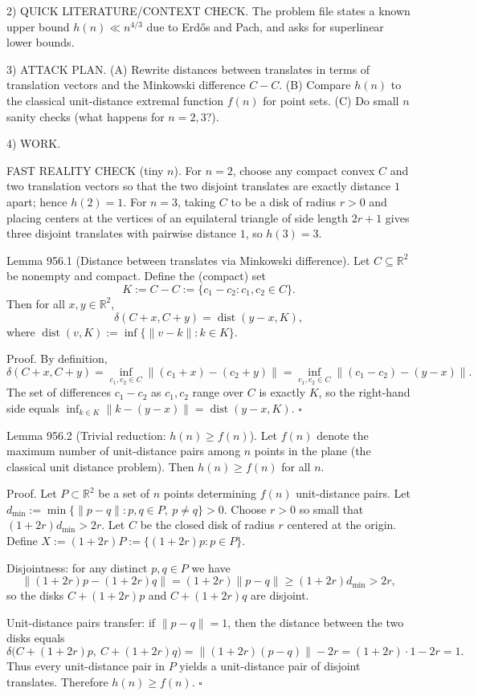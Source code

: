 2) QUICK LITERATURE/CONTEXT CHECK.
The problem file states a known upper bound $h(n)\ll n^{4/3}$ due to Erd\H{o}s and Pach, and asks for superlinear lower bounds.

3) ATTACK PLAN.
(A) Rewrite distances between translates in terms of translation vectors and the Minkowski difference $C-C$.
(B) Compare $h(n)$ to the classical unit-distance extremal function $f(n)$ for point sets.
(C) Do small $n$ sanity checks (what happens for $n=2,3$?).

4) WORK.

FAST REALITY CHECK (tiny $n$).
For $n=2$, choose any compact convex $C$ and two translation vectors so that the two disjoint translates are exactly distance $1$ apart; hence $h(2)=1$.
For $n=3$, taking $C$ to be a disk of radius $r>0$ and placing centers at the vertices of an equilateral triangle of side length $2r+1$ gives three disjoint translates with pairwise distance $1$, so $h(3)=3$.

Lemma 956.1 (Distance between translates via Minkowski difference).
Let $C\subseteq\mathbb{R}^2$ be nonempty and compact. Define the (compact) set
\[
K:=C-C:=\{c_1-c_2: c_1,c_2\in C\}.
\]
Then for all $x,y\in\mathbb{R}^2$,
\[
\delta(C+x, C+y) = \operatorname{dist}(y-x, K),
\]
where $\operatorname{dist}(v,K):=\inf\{\|v-k\|:k\in K\}$.

Proof.
By definition,
\[
\delta(C+x,C+y)=\inf_{c_1,c_2\in C}\| (c_1+x)-(c_2+y)\|
 =\inf_{c_1,c_2\in C}\|(c_1-c_2)-(y-x)\|.
\]
The set of differences $c_1-c_2$ as $c_1,c_2$ range over $C$ is exactly $K$, so the right-hand side equals
$\inf_{k\in K}\|k-(y-x)\|=\operatorname{dist}(y-x,K)$.
\hfill $\square$

Lemma 956.2 (Trivial reduction: $h(n)\ge f(n)$).
Let $f(n)$ denote the maximum number of unit-distance pairs among $n$ points in the plane (the classical unit distance problem).
Then $h(n)\ge f(n)$ for all $n$.

Proof.
Let $P\subset\mathbb{R}^2$ be a set of $n$ points determining $f(n)$ unit-distance pairs.
Let $d_{\min}:=\min\{\|p-q\|:p,q\in P,\ p\ne q\}>0$.
Choose $r>0$ so small that $(1+2r)d_{\min}>2r$.
Let $C$ be the closed disk of radius $r$ centered at the origin.
Define $X:=(1+2r)P:=\{(1+2r)p:p\in P\}$.

Disjointness: for any distinct $p,q\in P$ we have
\[\|(1+2r)p-(1+2r)q\|=(1+2r)\|p-q\|\ge (1+2r)d_{\min}>2r,\]
so the disks $C+(1+2r)p$ and $C+(1+2r)q$ are disjoint.

Unit-distance pairs transfer: if $\|p-q\|=1$, then the distance between the two disks equals
\[\delta\bigl(C+(1+2r)p,\ C+(1+2r)q\bigr)=\|(1+2r)(p-q)\|-2r=(1+2r)\cdot 1-2r=1.\]
Thus every unit-distance pair in $P$ yields a unit-distance pair of disjoint translates.
Therefore $h(n)\ge f(n)$.
\hfill $\square$

